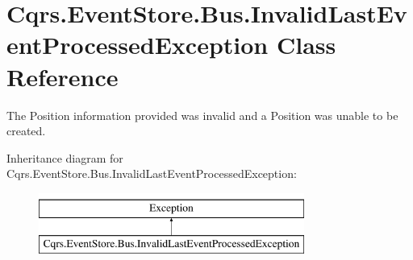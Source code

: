 \hypertarget{classCqrs_1_1EventStore_1_1Bus_1_1InvalidLastEventProcessedException}{}\section{Cqrs.\+Event\+Store.\+Bus.\+Invalid\+Last\+Event\+Processed\+Exception Class Reference}
\label{classCqrs_1_1EventStore_1_1Bus_1_1InvalidLastEventProcessedException}


The Position information provided was invalid and a Position was unable to be created.  


Inheritance diagram for Cqrs.\+Event\+Store.\+Bus.\+Invalid\+Last\+Event\+Processed\+Exception\+:\begin{figure}[H]
\begin{center}
\leavevmode
\includegraphics[height=2.000000cm]{classCqrs_1_1EventStore_1_1Bus_1_1InvalidLastEventProcessedException}
\end{center}
\end{figure}
